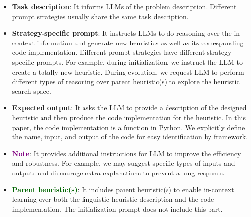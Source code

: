 \begin{itemize}[itemsep=-3pt]
    \item \textcolor {darkbrown}{\textbf{Task description}}: It informs LLMs of the problem description. Different prompt strategies usually share the same task description.
    \item {\textbf{Strategy-specific prompt}}: It instructs LLMs to do reasoning over the in-context information and generate new heuristics as well as its corresponding code implementation. Different prompt strategies have different strategy-specific prompts. For example, during initialization, we instruct the LLM to create a totally new heuristic. During evolution, we request LLM to perform different types of reasoning over parent heuristic(s) to explore the heuristic search space.
    \item \textcolor{navyblue}{\textbf{Expected output}}: It asks the LLM to provide a description of the designed heuristic and then produce the code implementation for the heuristic. In this paper, the code implementation is a function in Python. We explicitly define the name, input, and output of the code for easy identification by \ourmethod{} framework. 
    \item \textcolor{purple}{\textbf{Note}}: It provides additional instructions for LLM to improve the efficiency and robustness. For example, we may suggest specific types of inputs and outputs and discourage extra explanations to prevent a long response.
    \item \textcolor{darkgreen}{\textbf{Parent heuristic(s)}}: It includes parent heuristic(s) to enable in-context learning over both the linguistic heuristic description and the code implementation. The initialization prompt does not include this part.
\end{itemize}


